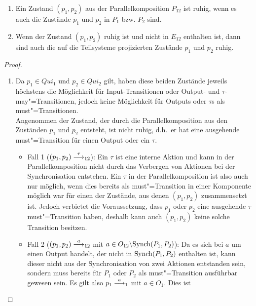 \begin{Lem}\mbox{}
  \label{RuheZustLem}
  \begin{enumerate}
    \item Ein Zustand $(p_1,p_2)$ aus der Parallelkomposition $P_{12}$ ist
      ruhig, wenn es auch die Zustände $p_1$ und $p_2$ in $P_1$ bzw. $P_2$
      sind.
    \item Wenn der Zustand $(p_1,p_2)$ ruhig ist und nicht in $E_{12}$
      enthalten ist, dann sind auch die auf die Teilsysteme projizierten
      Zustände $p_1$ und $p_2$ ruhig.
  \end{enumerate}
\end{Lem}
\begin{proof}\mbox{}
  \begin{enumerate}
    \item Da $p_1\in Qui_1$ und $p_2\in Qui_2$ gilt, haben diese beiden
      Zustände jeweils höchstens die Möglichkeit für Input-Transitionen oder
      Output- und $\tau$-may"=Transitionen, jedoch keine Möglichkeit für Outputs
      oder $\tau$s als must"=Transitionen.\\
      Angenommen der Zustand, der durch die Parallelkomposition aus den
      Zuständen $p_1$ und $p_2$ entsteht, ist nicht ruhig, d.h.\ er hat eine
      ausgehende must"=Transition für einen Output oder ein $\tau$.
      \begin{itemize}
        \item Fall 1 \big($(p_1,p_2)\must[\tau]_{12}$\big): Ein $\tau$ ist eine
          interne Aktion und kann in der Parallelkomposition nicht durch das
          Verbergen von Aktionen bei der Synchronisation entstehen. Ein $\tau$
          in der Parallelkomposition ist also auch nur möglich, wenn dies
          bereits als must"=Transition in einer Komponente möglich war für
          einen der Zustände, aus denen $(p_1,p_2)$ zusammensetzt ist. Jedoch
          verbietet die Voraussetzung, dass $p_1$ oder $p_2$ eine ausgehende
          $\tau$ must"=Transition haben, deshalb kann auch $(p_1,p_2)$ keine
          solche Transition besitzen.
        \item Fall 2 \big($(p_1,p_2)\must[a]_{12}$ mit $a\in O_{12}\backslash
          \mathrm{Synch}(P_1,P_2)$\big): Da es sich bei $a$ um einen Output handelt, der
          nicht in $\mathrm{Synch} (P_1,P_2)$ enthalten ist, kann dieser nicht aus der
          Synchronisation von zwei Aktionen entstanden sein, sondern muss
          bereits für $P_1$ oder $P_2$ als must"=Transition ausführbar gewesen
          sein. Es gilt also \oBdA{} $p_1\must[a]_1$ mit $a\in O_1$. Dies ist

\end{itemize}
\end{enumerate}
\end{proof}
